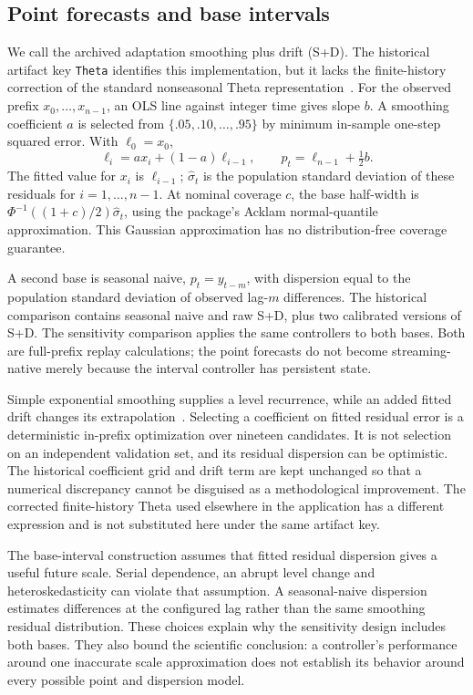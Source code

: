 \documentclass[11pt,a4paper]{article}
\begin{document}
\subsection{Point forecasts and base intervals}
We call the archived adaptation smoothing plus drift (S+D). The historical artifact key \texttt{Theta} identifies this implementation, but it lacks the finite-history correction of the standard nonseasonal Theta representation~\cite{hyndman2003}. For the observed prefix $x_0,\ldots,x_{n-1}$, an OLS line against integer time gives slope $b$. A smoothing coefficient $a$ is selected from $\{.05,.10,\ldots,.95\}$ by minimum in-sample one-step squared error. With $\ell_0=x_0$,
\begin{equation}
\ell_i=a x_i+(1-a)\ell_{i-1},\qquad
p_t=\ell_{n-1}+\tfrac12 b.
\end{equation}
The fitted value for $x_i$ is $\ell_{i-1}$; $\hat\sigma_t$ is the population standard deviation of these residuals for $i=1,\ldots,n-1$. At nominal coverage $c$, the base half-width is $\Phi^{-1}((1+c)/2)\hat\sigma_t$, using the package's Acklam normal-quantile approximation. This Gaussian approximation has no distribution-free coverage guarantee.

A second base is seasonal naive, $p_t=y_{t-m}$, with dispersion equal to the population standard deviation of observed lag-$m$ differences. The historical comparison contains seasonal naive and raw S+D, plus two calibrated versions of S+D. The sensitivity comparison applies the same controllers to both bases. Both are full-prefix replay calculations; the point forecasts do not become streaming-native merely because the interval controller has persistent state.

Simple exponential smoothing supplies a level recurrence, while an added fitted drift changes its extrapolation~\cite{fpp3}. Selecting a coefficient on fitted residual error is a deterministic in-prefix optimization over nineteen candidates. It is not selection on an independent validation set, and its residual dispersion can be optimistic. The historical coefficient grid and drift term are kept unchanged so that a numerical discrepancy cannot be disguised as a methodological improvement. The corrected finite-history Theta used elsewhere in the application has a different expression and is not substituted here under the same artifact key.

The base-interval construction assumes that fitted residual dispersion gives a useful future scale. Serial dependence, an abrupt level change and heteroskedasticity can violate that assumption. A seasonal-naive dispersion estimates differences at the configured lag rather than the same smoothing residual distribution. These choices explain why the sensitivity design includes both bases. They also bound the scientific conclusion: a controller's performance around one inaccurate scale approximation does not establish its behavior around every possible point and dispersion model.
\end{document}
